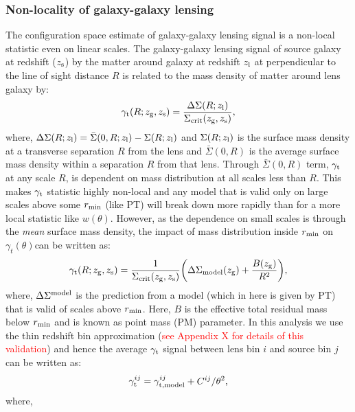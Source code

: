 \documentclass[fleqn,usenatbib]{mnras}
\newcommand{\gammat}{\ensuremath{\gamma_{t}(\theta)}}
\newcommand{\wtheta}{\ensuremath{w(\theta)}}
\newcommand{\red}[1]{\textcolor{red}{#1}}
\begin{document}
\subsubsection{Non-locality of galaxy-galaxy lensing}  
\label{sec:pm_theory}
The configuration space estimate of galaxy-galaxy lensing signal is a non-local statistic even on linear scales. The galaxy-galaxy lensing signal of source galaxy at redshift ($z_{\rm s}$) by the matter around galaxy at redshift $z_{\rm l}$ at perpendicular to the line of sight distance $R$ is related to the mass density of matter around lens galaxy by:
\begin{equation}
    \gamma_{\rm t}(R;z_{\rm g},z_{\rm s}) = \frac{\Delta \Sigma (R;z_{\rm l})}{\Sigma_{\rm crit} (z_{\rm g},z_{\rm s})},
\end{equation}
where, $\Delta \Sigma(R;z_{\rm l}) = \bar{\Sigma}(0,R; z_{\rm l}) - \Sigma(R;z_{\rm l})$ and $\Sigma(R;z_{\rm l})$ is the surface mass density at a transverse separation $R$ from the lens and $\bar{\Sigma}(0,R)$ is the average surface mass density within a separation $R$ from that lens. Through $\bar{\Sigma}(0,R)$ term, $\gamma_{\rm t}$  at any scale $R$, is dependent on mass distribution at all scales less than $R$. This makes $\gamma_{\rm t}$ statistic highly non-local and any model that is valid only on large scales above some $r_{\rm min}$ (like PT) will break down more rapidly than for a more local statistic like \wtheta. However, as the dependence on small scales is through the \textit{mean} surface mass density, the impact of mass distribution inside $r_{\rm min}$ on \gammat can be written as:
\begin{equation}
    \gamma_{\rm t}(R;z_{\rm g},z_{\rm s}) = \frac{1}{\Sigma_{\rm crit}(z_{\rm g},z_{\rm s})} \bigg(\Delta \Sigma_{\rm model}(z_{\rm g}) + \frac{B(z_{\rm g})}{R^2} \bigg),
\end{equation}
where, $\Delta \Sigma^{\rm model}$ is the prediction from a model (which in here is given by PT) that is valid of scales above $r_{\rm min}$. Here, $B$ is the effective total residual mass below $r_{\rm min}$ and is known as point mass (PM) parameter. In this analysis we use the thin redshift bin approximation (\red{see Appendix X for details of this validation}) and hence the average $\gamma_{\rm t}$ signal between lens bin $i$ and source bin $j$ can be written as:
\begin{equation}
    \gamma^{ij}_{{\rm t}} = \gamma^{ij}_{{\rm t, model}} + C^{ij}/\theta^2,
\end{equation}
where,
\end{document}
